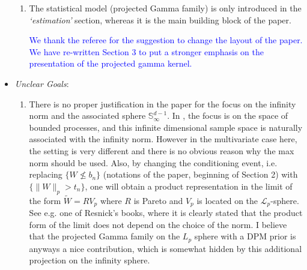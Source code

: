 \documentclass[10pt]{article}
\newcommand{\response}[1]{\textcolor{blue}{#1}}
\begin{document}
\begin{itemize}
\begin{enumerate}
        \item The statistical model (projected Gamma family) is only introduced in the
            \emph{‘estimation’} section, whereas it is the main building block of the paper.

\response{We thank the referee for the suggestion to change the layout of the paper. We have
            re-written Section 3 to put a stronger emphasis on the presentation of the
            projected gamma kernel.
            }
            
        \end{enumerate}

    \item \emph{Unclear Goals}: 
    \begin{enumerate}
        \item There is no proper justification in the paper for the focus on the infinity norm 
        and the associated sphere $\mathbb{S}_{\infty}^{d-1}$. In \cite{ferreira2014}, the focus
        is on the space of bounded processes, and this infinite dimensional sample space is 
        naturally associated with the infinity norm. However in the multivariate case here, the 
        setting is very different and there is no obvious reason why the max norm should be used. 
        Also, by changing the conditioning event, i.e. replacing $\lbrace W \not\leq b_{n}\rbrace$
        (notations of the paper, beginning of Section 2) with 
        $\lbrace \lVert W\rVert_p > t_n\rbrace$, one will obtain a product representation in the 
        limit of the form $\tilde{W} = RV_p$ where $R$ is Pareto and $V_p$ is located on the 
        $\mathcal{L}_p$-sphere. See e.g. one of Resnick’s books, where it is clearly stated that 
        the product form of the limit does not depend on the choice of the norm. I believe that 
        the projected Gamma family on the $L_p$ sphere with a DPM prior is anyways a nice 
        contribution, which is somewhat hidden by this additional projection on the infinity sphere.


\end{enumerate}
\end{itemize}
\end{document}
